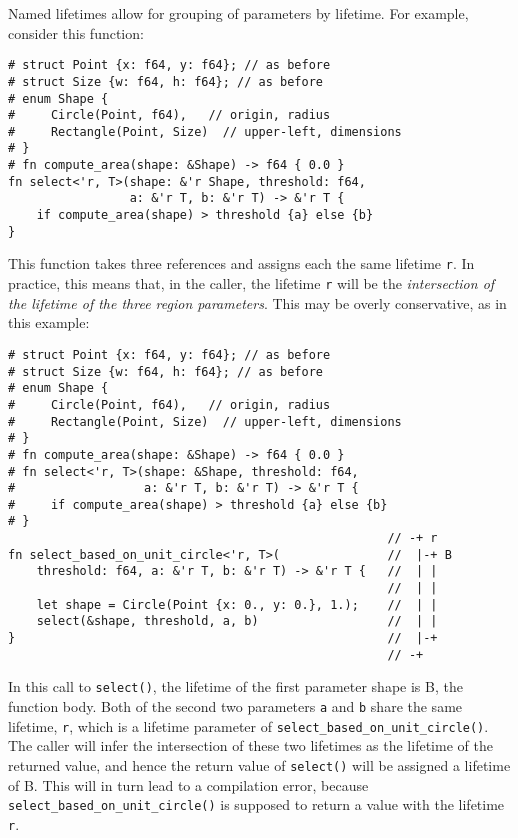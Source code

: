 \documentclass[]{article}
\begin{document}
Named lifetimes allow for grouping of parameters by lifetime. For
example, consider this function:

\begin{verbatim}
# struct Point {x: f64, y: f64}; // as before
# struct Size {w: f64, h: f64}; // as before
# enum Shape {
#     Circle(Point, f64),   // origin, radius
#     Rectangle(Point, Size)  // upper-left, dimensions
# }
# fn compute_area(shape: &Shape) -> f64 { 0.0 }
fn select<'r, T>(shape: &'r Shape, threshold: f64,
                 a: &'r T, b: &'r T) -> &'r T {
    if compute_area(shape) > threshold {a} else {b}
}
\end{verbatim}

This function takes three references and assigns each the same lifetime
\texttt{r}. In practice, this means that, in the caller, the lifetime
\texttt{r} will be the \emph{intersection of the lifetime of the three
region parameters}. This may be overly conservative, as in this example:

\begin{verbatim}
# struct Point {x: f64, y: f64}; // as before
# struct Size {w: f64, h: f64}; // as before
# enum Shape {
#     Circle(Point, f64),   // origin, radius
#     Rectangle(Point, Size)  // upper-left, dimensions
# }
# fn compute_area(shape: &Shape) -> f64 { 0.0 }
# fn select<'r, T>(shape: &Shape, threshold: f64,
#                  a: &'r T, b: &'r T) -> &'r T {
#     if compute_area(shape) > threshold {a} else {b}
# }
                                                     // -+ r
fn select_based_on_unit_circle<'r, T>(               //  |-+ B
    threshold: f64, a: &'r T, b: &'r T) -> &'r T {   //  | |
                                                     //  | |
    let shape = Circle(Point {x: 0., y: 0.}, 1.);    //  | |
    select(&shape, threshold, a, b)                  //  | |
}                                                    //  |-+
                                                     // -+
\end{verbatim}

In this call to \texttt{select()}, the lifetime of the first parameter
shape is B, the function body. Both of the second two parameters
\texttt{a} and \texttt{b} share the same lifetime, \texttt{r}, which is
a lifetime parameter of \texttt{select\_based\_on\_unit\_circle()}. The
caller will infer the intersection of these two lifetimes as the
lifetime of the returned value, and hence the return value of
\texttt{select()} will be assigned a lifetime of B. This will in turn
lead to a compilation error, because
\texttt{select\_based\_on\_unit\_circle()} is supposed to return a value
with the lifetime \texttt{r}.
\end{document}
